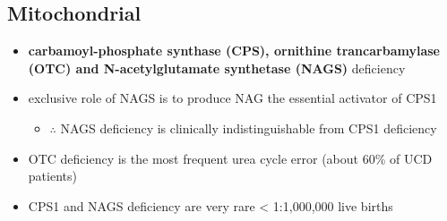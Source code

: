 \documentclass{scrartcl}
\begin{document}
\subsection{Mitochondrial}
\label{sec:org21cc877}
\begin{itemize}
\item \textbf{carbamoyl-phosphate synthase (CPS), ornithine trancarbamylase (OTC) and N-acetylglutamate synthetase (NAGS)} deficiency
\item exclusive role of NAGS is to produce NAG the essential activator of CPS1
\begin{itemize}
\item \(\therefore\) NAGS deficiency is clinically indistinguishable from
CPS1 deficiency
\end{itemize}
\item OTC deficiency is the most frequent urea cycle error (about 60\% of UCD patients)
\item CPS1 and NAGS deficiency are very rare \textless{} 1:1,000,000 live births
\end{itemize}
\end{document}
